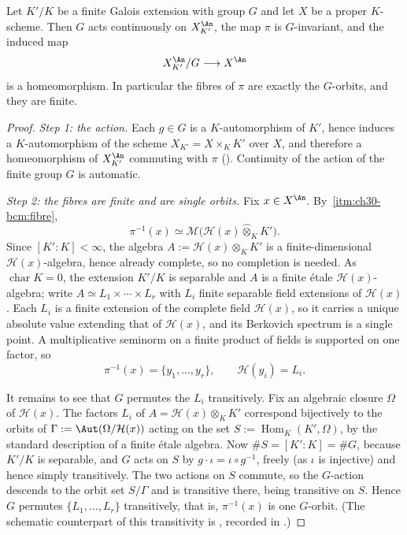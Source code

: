 \begin{theorem}
\label{thm:ch30-galois-quotient}
Let $K'/K$ be a finite Galois extension with group $G$ and let $X$ be
a proper $K$-scheme.  Then $G$ acts continuously on $X_{K'}^{\An}$,
the map $\pi$ is $G$-invariant, and the induced map
\begin{equation}
\label{eq:ch30-galois-quotient}
 X_{K'}^{\An}/G\longrightarrow X^{\An}
\end{equation}
is a homeomorphism.  In particular the fibres of $\pi$ are exactly the
$G$-orbits, and they are finite.
\end{theorem}

\begin{proof}
\emph{Step 1: the action.}  Each $g\in G$ is a $K$-automorphism of
$K'$, hence induces a $K$-automorphism of the scheme
$X_{K'}=X\times_KK'$ over $X$, and therefore a homeomorphism of
$X_{K'}^{\An}$ commuting with $\pi$
().  Continuity of the action of the finite
group $G$ is automatic.

\emph{Step 2: the fibres are finite and are single orbits.}  Fix
$x\in X^{\An}$.  By
\,\cref{itm:ch30-bcm:fibre},
\[
 \pi^{-1}(x)\simeq
 \mathcal M\bigl(\mathcal H(x)\widehat\otimes_KK'\bigr).
\]
Since $[K':K]<\infty$, the algebra $A:=\mathcal H(x)\otimes_KK'$ is a
finite-dimensional $\mathcal H(x)$-algebra, hence already complete, so no
completion is needed.  As $\operatorname{char}K=0$, the extension
$K'/K$ is separable and $A$ is a finite étale
$\mathcal H(x)$-algebra; write
$A\simeq L_1\times\cdots\times L_r$ with $L_i$ finite separable field
extensions of $\mathcal H(x)$.  Each $L_i$ is a finite extension of the
complete field $\mathcal H(x)$, so it carries a unique absolute value
extending that of $\mathcal H(x)$, and its Berkovich spectrum is a single
point.  A multiplicative seminorm on a finite product of fields is supported
on one factor, so
\[
 \pi^{-1}(x)=\{y_1,\ldots,y_r\},
 \qquad \mathcal H(y_i)=L_i .
\]

It remains to see that $G$ permutes the $L_i$ transitively.  Fix an
algebraic closure $\Omega$ of $\mathcal H(x)$.  The factors $L_i$ of
$A=\mathcal H(x)\otimes_KK'$ correspond bijectively to the orbits of
$\Gamma:=\Aut(\Omega/\mathcal H(x))$ acting on the set
$S:=\operatorname{Hom}_K(K',\Omega)$, by the standard description of a
finite étale algebra.  Now $\#S=[K':K]=\#G$, because $K'/K$ is
separable, and $G$ acts on $S$ by $g\cdot\iota=\iota\circ g^{-1}$,
freely (as $\iota$ is injective) and hence simply transitively.  The two
actions on $S$ commute, so the $G$-action descends to the orbit set
$S/\Gamma$ and is transitive there, being transitive on $S$.  Hence
$G$ permutes $\{L_1,\ldots,L_r\}$ transitively, that is,
$\pi^{-1}(x)$ is one $G$-orbit.  (The schematic counterpart of this
transitivity is \cite[Tag 0BRI]{stacks-project}, recorded in
.)


\end{proof}
